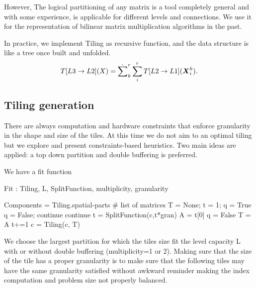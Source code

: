 \documentclass[acmsmall]{acmart}
\begin{document}
However, The logical partitioning of any matrix is a tool completely
general and with some experience, is applicable for different levels
and connections. We use it for the representation of bilinear matrix
multiplication algorithms in the past.

In practice, we implement Tiling as recursive function, and the data
structure is like a tree once built and unfolded.
\begin{equation}
  T[L3\rightarrow L2](X) = \dot\sum_k^r\sum_{i}^rT[L2\rightarrow L1]({\boldsymbol X}^{k}_{i}).
\end{equation}


\subsection{Tiling generation}
\label{sec:tiling-generation}
There are always computation and hardware constraints that enforce
granularity in the shape and size of the tiles. At this time we do
not aim to an optimal tiling but we explore and present
constraints-based heuristics. Two main ideas are applied: a top down
partition and double buffering is preferred.

We have a fit function 



{\tiny
  \begin{algorithm}
    \caption{Fit : Tiling, L, SplitFunction, multiplicity, granularity }
    \label{alg:fit}
    \begin{algorithmic}
      \STATE Components = Tiling.spatial-parts    \# list of matrices 
        \STATE T  = None;  t = 1;         q = True
            \STATE q = False; continue
        \ENDIF
            \STATE continue
        \ENDIF
        \STATE t = SplitFunction(c,t*gran) 
        \STATE A = t[0]   
        \STATE q = False
        \STATE T = A
        \ENDIF
        \STATE t+=1
        \ENDWHILE
      \STATE c = Tiling(c, T) 
      \ENDWHILE
    \end{algorithmic}
  \end{algorithm}
}

We choose the largest partition for which the tiles size fit the level
capacity L with or without double buffering (multiplicity=1 or
2). Making sure that the size of the tile has a proper granularity is
to make sure that the following tiles may have the same granularity
satisfied without awkward reminder making the index computation and
problem size not properly balanced.
\end{document}
